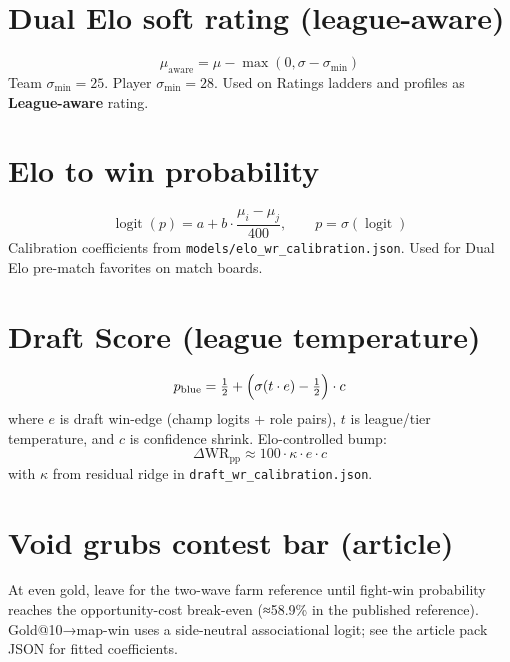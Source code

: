 
\section{Dual Elo soft rating (league-aware)}
\label{eq:soft-mu}
\[
\mu_{\mathrm{aware}}
=
\mu - \max(0,\sigma - \sigma_{\min})
\]
Team \(\sigma_{\min}=25\). Player \(\sigma_{\min}=28\).
Used on Ratings ladders and profiles as \textbf{League-aware} rating.

\section{Elo to win probability}
\label{eq:elo-wr}
\[
\operatorname{logit}(p)
=
a + b\cdot\frac{\mu_i-\mu_j}{400},
\qquad
p=\sigma(\operatorname{logit})
\]
Calibration coefficients from \texttt{models/elo\_wr\_calibration.json}.
Used for Dual Elo pre-match favorites on match boards.

\section{Draft Score (league temperature)}
\label{eq:draft}
\[
p_{\mathrm{blue}}
=
\tfrac12 + \Bigl(\sigma(t\cdot e)- \tfrac12\Bigr)\cdot c
\]
where \(e\) is draft win-edge (champ logits + role pairs), \(t\) is league/tier temperature,
and \(c\) is confidence shrink.
Elo-controlled bump:
\[
\Delta\mathrm{WR}_{\mathrm{pp}}
\approx
100\cdot \kappa\cdot e\cdot c
\]
with \(\kappa\) from residual ridge in \texttt{draft\_wr\_calibration.json}.

\section{Void grubs contest bar (article)}
\label{eq:grubs}
At even gold, leave for the two-wave farm reference until fight-win probability reaches
the opportunity-cost break-even (≈58.9\% in the published reference). Gold@10→map-win uses a
side-neutral associational logit; see the article pack JSON for fitted coefficients.
